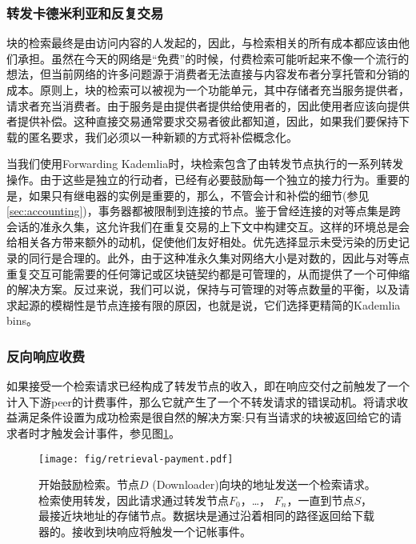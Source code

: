 \green{}

\subsubsection{转发卡德米利亚和反复交易}

块的检索最终是由访问内容的人发起的，因此，与检索相关的所有成本都应该由他们承担。虽然在今天的网络是“免费”的时候，付费检索可能听起来不像一个流行的想法，但当前网络的许多问题源于消费者无法直接与内容发布者分享托管和分销的成本。原则上，块的检索可以被视为一个功能单元，其中存储者充当服务提供者，请求者充当消费者。由于服务是由提供者提供给使用者的，因此使用者应该向提供者提供补偿。这种直接交易通常要求交易者彼此都知道，因此，如果我们要保持下载的匿名要求，我们必须以一种新颖的方式将补偿概念化。

当我们使用Forwarding Kademlia时，块检索包含了由转发节点执行的一系列转发操作。由于这些是独立的行动者，已经有必要鼓励每一个独立的接力行为。重要的是，如果只有继电器的实例是重要的，那么，不管会计和补偿的细节(参见\ref{sec:accounting})，事务器都被限制到连接的节点。鉴于曾经连接的对等点集是跨会话的准永久集，这允许我们在重复交易的上下文中构建交互。这样的环境总是会给相关各方带来额外的动机，促使他们友好相处。优先选择显示未受污染的历史记录的同行是合理的。此外，由于这种准永久集对网络大小是对数的，因此与对等点重复交互可能需要的任何簿记或区块链契约都是可管理的，从而提供了一个可伸缩的解决方案。反过来说，我们可以说，保持与可管理的对等点数量的平衡，以及请求起源的模糊性是节点连接有限的原因，也就是说，它们选择更精简的Kademlia bins。

\subsubsection{反向响应收费}

如果接受一个检索请求已经构成了转发节点的收入，即在响应交付之前触发了一个计入下游peer的计费事件，那么它就产生了一个不转发请求的错误动机。将请求收益满足条件设置为成功检索是很自然的解决方案:只有当请求的块被返回给它的请求者时才触发会计事件，参见图\ref{fig:retrieval-payment}。


\begin{figure}[htbp]
   \centering
   \texttt{[image: fig/retrieval-payment.pdf]}
   \caption[开始鼓励检索\statusgreen]{开始鼓励检索。节点$D$ (Downloader)向块的地址发送一个检索请求。检索使用转发，因此请求通过转发节点$F_0$，…， $F_n$，一直到节点$S$，最接近块地址的存储节点。数据块是通过沿着相同的路径返回给下载器的。接收到块响应将触发一个记帐事件。}
   \label{fig:retrieval-payment}
\end{figure}

